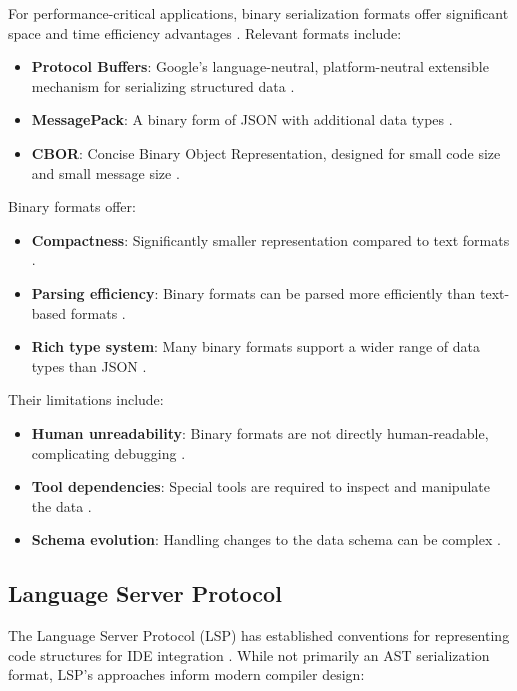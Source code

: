 For performance-critical applications, binary serialization formats offer significant space and time efficiency advantages \cite{warren2006hacker}. Relevant formats include:

\begin{itemize}
    \item \textbf{Protocol Buffers}: Google's language-neutral, platform-neutral extensible mechanism for serializing structured data \cite{varda2008protocol}.
    \item \textbf{MessagePack}: A binary form of JSON with additional data types \cite{furuhashi2013messagepack}.
    \item \textbf{CBOR}: Concise Binary Object Representation, designed for small code size and small message size \cite{bormann2013cbor}.
\end{itemize}

Binary formats offer:
\begin{itemize}
    \item \textbf{Compactness}: Significantly smaller representation compared to text formats \cite{warren2006hacker}.
    \item \textbf{Parsing efficiency}: Binary formats can be parsed more efficiently than text-based formats \cite{warren2006hacker}.
    \item \textbf{Rich type system}: Many binary formats support a wider range of data types than JSON \cite{varda2008protocol}.
\end{itemize}

Their limitations include:
\begin{itemize}
    \item \textbf{Human unreadability}: Binary formats are not directly human-readable, complicating debugging \cite{warren2006hacker}.
    \item \textbf{Tool dependencies}: Special tools are required to inspect and manipulate the data \cite{varda2008protocol}.
    \item \textbf{Schema evolution}: Handling changes to the data schema can be complex \cite{varda2008protocol}.
\end{itemize}

\subsection{Language Server Protocol}

The Language Server Protocol (LSP) has established conventions for representing code structures for IDE integration \cite{microsoft2016language}. While not primarily an AST serialization format, LSP's approaches inform modern compiler design:

